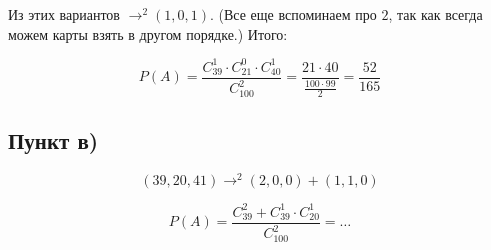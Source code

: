 \documentclass{article}
\begin{document}
Из этих вариантов $\rightarrow^2 (1, 0, 1)$. (Все еще вспоминаем про $2$, так как всегда можем карты взять в другом порядке.) Итого:

$$P(A) = \frac{C_{39}^1 \cdot C_21^0 \cdot C_{40}^1}{C_{100}^2} = \frac{21 \cdot 40}{\frac{100 \cdot 99}{2}} = \frac{52}{165}$$

\subsection{Пункт в)}

$$(39, 20, 41) \rightarrow^2(2, 0, 0) + (1, 1, 0)$$

$$P(A) = \frac{C_{39}^2 + C_{39}^1 \cdot C_{20}^1}{C_{100}^2} = \ldots$$
\end{document}
